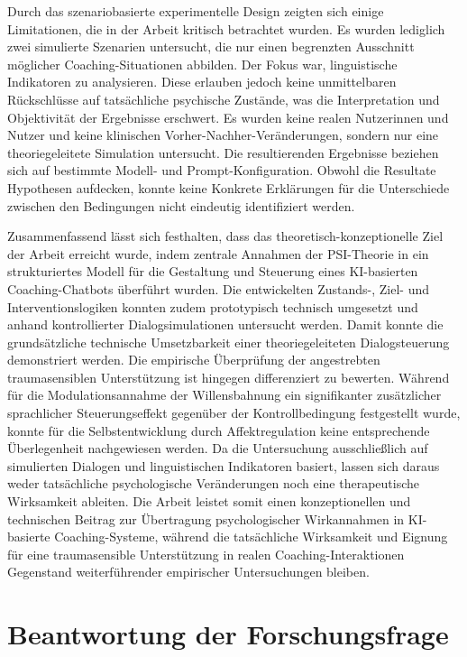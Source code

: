 Durch das szenariobasierte experimentelle Design zeigten sich einige Limitationen, die in der Arbeit kritisch betrachtet wurden. Es wurden lediglich zwei simulierte Szenarien untersucht, die nur einen begrenzten Ausschnitt möglicher Coaching-Situationen abbilden.
Der Fokus war, linguistische Indikatoren zu analysieren. Diese erlauben jedoch keine unmittelbaren Rückschlüsse auf tatsächliche psychische Zustände, was die Interpretation und Objektivität der Ergebnisse erschwert.
Es wurden keine realen Nutzerinnen und Nutzer und keine klinischen Vorher-Nachher-Veränderungen, sondern nur eine theoriegeleitete Simulation untersucht. Die resultierenden Ergebnisse beziehen sich auf bestimmte Modell- und Prompt-Konfiguration. Obwohl die Resultate Hypothesen aufdecken, konnte keine Konkrete Erklärungen für die Unterschiede zwischen den Bedingungen nicht eindeutig identifiziert werden.

Zusammenfassend lässt sich festhalten, dass das theoretisch-konzeptionelle Ziel der Arbeit erreicht wurde, indem zentrale Annahmen der PSI-Theorie in ein strukturiertes Modell für die Gestaltung und Steuerung eines KI-basierten Coaching-Chatbots überführt wurden. Die entwickelten Zustands-, Ziel- und Interventionslogiken konnten zudem prototypisch technisch umgesetzt und anhand kontrollierter Dialogsimulationen untersucht werden. Damit konnte die grundsätzliche technische Umsetzbarkeit einer theoriegeleiteten Dialogsteuerung demonstriert werden. Die empirische Überprüfung der angestrebten traumasensiblen Unterstützung ist hingegen differenziert zu bewerten. Während für die Modulationsannahme der Willensbahnung ein signifikanter zusätzlicher sprachlicher Steuerungseffekt gegenüber der Kontrollbedingung festgestellt wurde, konnte für die Selbstentwicklung durch Affektregulation keine entsprechende Überlegenheit nachgewiesen werden. Da die Untersuchung ausschließlich auf simulierten Dialogen und linguistischen Indikatoren basiert, lassen sich daraus weder tatsächliche psychologische Veränderungen noch eine therapeutische Wirksamkeit ableiten. Die Arbeit leistet somit einen konzeptionellen und technischen Beitrag zur Übertragung psychologischer Wirkannahmen in KI-basierte Coaching-Systeme, während die tatsächliche Wirksamkeit und Eignung für eine traumasensible Unterstützung in realen Coaching-Interaktionen Gegenstand weiterführender empirischer Untersuchungen bleiben.


\section{Beantwortung der Forschungsfrage}

